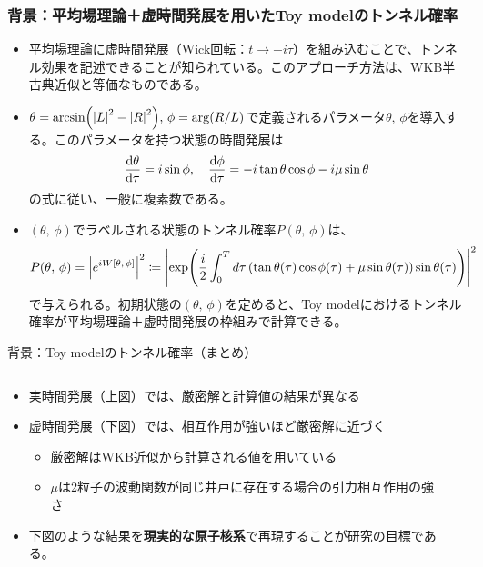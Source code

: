 \documentclass[11pt,aspectratio=169,xcolor=dvipsnames,table,dvipdfmx]{beamer}
\theoremstyle{definition}
\begin{document}
\begin{frame}
  \frametitle{背景：平均場理論＋虚時間発展を用いたToy modelのトンネル確率}
  \begin{itemize}
    \item 平均場理論に虚時間発展（Wick回転：$t\to -i\tau$）を組み込むことで、トンネル効果を記述できることが知られている。このアプローチ方法は、WKB半古典近似と等価なものである。
    \item $\theta = \arcsin(\abs{L}^2-\abs{R}^2),\,\phi = \arg(R/L)$で定義されるパラメータ$\theta,\,\phi$を導入する。このパラメータを持つ状態の時間発展は
    \begin{equation}
      \dv{\theta}{\tau} = i\sin\phi,\quad \dv{\phi}{\tau} = -i\tan\theta\cos\phi - i\mu\sin\theta
    \end{equation}
    の式に従い、一般に複素数である。
    \item $(\theta,\,\phi)$でラベルされる状態のトンネル確率$P(\theta,\,\phi)$は、
    \begin{equation}
      P(\theta,\,\phi) = \abs{e^{iW[\theta,\,\phi]}}^2 \coloneqq \abs{\exp(\frac{i}{2}\int_0^T d\tau\, (\tan\theta(\tau)\cos\phi(\tau) + \mu\sin\theta(\tau))\sin\theta(\tau))}^2
    \end{equation}
    で与えられる。初期状態の$(\theta,\,\phi)$を定めると、Toy modelにおけるトンネル確率が平均場理論＋虚時間発展の枠組みで計算できる。
  \end{itemize}
\end{frame}

\begin{frame}{背景：Toy modelのトンネル確率（まとめ）}
  \begin{columns}[t]
    \begin{column}{.5\textwidth}
      \begin{itemize}
        \item 実時間発展（上図）では、{\color{blue}厳密解}と{\color{orange}計算値}の結果が異なる
        \item 虚時間発展（下図）では、相互作用が強いほど{\color{blue}厳密解}に近づく
        \begin{itemize}
          \item {\color{blue}厳密解}はWKB近似から計算される値を用いている
          \item $\mu$は2粒子の波動関数が同じ井戸に存在する場合の引力相互作用の強さ
        \end{itemize}
        \item 下図のような結果を\textbf{現実的な原子核系}で再現することが研究の目標である。
      \end{itemize}
    \end{column}
    \begin{column}{.5\textwidth}
    \end{column}
  \end{columns}
\end{frame}
\end{document}
